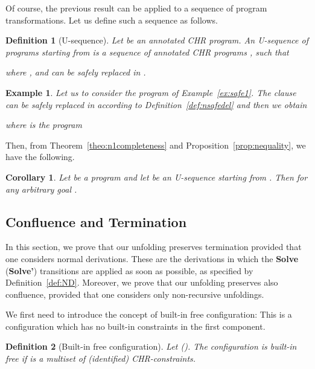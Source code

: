 \documentclass{tlp}
\newtheorem{definition}{Definition} \newtheorem{proposition}{Proposition} \newtheorem{example}{Example} \newtheorem{corollary}{Corollary} \newtheorem{theorem}{Theorem} \newtheorem{lemma}{Lemma}
\begin{document}
Of course, the previous result can be applied to a sequence of program transformations.
Let us define such a sequence as follows.

\begin{definition}[{\sc U-sequence}]\label{def:uno}
Let  be an annotated CHR program. An \emph{U-sequence} of programs
starting from  is a sequence of annotated CHR programs , such that

 where ,  and can be safely replaced in .
\end{definition}

\begin{example}\label{ex:safe2}
Let us to consider the program  of Example~\ref{ex:safe1}. The clause  can be safely replaced in  according to Definition~\ref{def:nsafedel} and then we obtain

where  is the program


\end{example}

Then, from  Theorem~\ref{theo:n1completeness} and
Proposition~\ref{prop:nequality}, we have the
following.

\begin{corollary}\label{lemma:ncompleteness}
Let  be a program and let  be an U-sequence starting from . Then
 for any arbitrary goal
.
\end{corollary}

\subsection{Confluence and Termination}\label{sec:confluence&termination}

In this section, we prove that our unfolding preserves termination
provided that one considers normal derivations. These
are the derivations in which the  \textbf{Solve} (\textbf{Solve'})
transitions are applied as soon as possible, as specified by Definition~\ref{def:ND}.
Moreover, we prove that our unfolding preserves also confluence, provided that one considers only non-recursive unfoldings.

We first need to introduce the concept of built-in
free configuration: This is a configuration which has no built-in constraints in the first component. 

\begin{definition}[{\sc Built-in free configuration}]\label{def:BFS}
Let   ().
The configuration  is built-in free  if
 is a multiset of (identified) CHR-constraints.
\end{definition}
\end{document}
